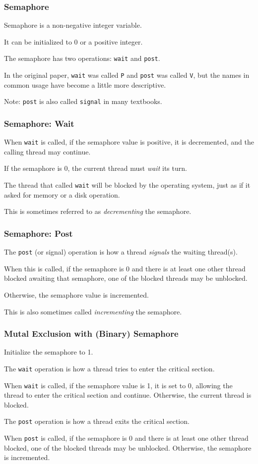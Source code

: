 \begin{frame}
	\frametitle{Semaphore}

	Semaphore is a \alert{non-negative} integer variable.

	It can be initialized to 0 or a positive integer.

	The semaphore has two operations: \texttt{wait} and \texttt{post}.

	In the original paper, \texttt{wait} was called \texttt{P} and \texttt{post} was called \texttt{V}, but the names in common usage have become a little more descriptive.

	Note: \texttt{post} is also called \texttt{signal} in many textbooks.


\end{frame}

\begin{frame}
	\frametitle{Semaphore: Wait}

	When \texttt{wait} is called, if the semaphore value is positive, it is decremented, and the calling thread may continue.

	If the semaphore is 0, the current thread must \textit{wait} its turn.

	The thread that called \texttt{wait} will be blocked by the operating system, just as if it asked for memory or a disk operation.

	This is sometimes referred to as \emph{decrementing} the semaphore.

\end{frame}

\begin{frame}
	\frametitle{Semaphore: Post}

	The \texttt{post} (or signal) operation is how a thread \textit{signals} the waiting thread(s).

	When this is called, if the semaphore is 0 and there is at least one other thread blocked awaiting that semaphore, one of the blocked threads may be unblocked.

	Otherwise, the semaphore value is incremented.

	This is also sometimes called \emph{incrementing} the semaphore.

\end{frame}

\begin{frame}
	\frametitle{Mutal Exclusion with (Binary) Semaphore}

	Initialize the semaphore to 1.

	The \texttt{wait} operation is how a thread tries to enter the critical section.

	When \texttt{wait} is called, if the semaphore value is 1, it is set to 0, allowing the thread to enter the critical section and continue.
	Otherwise, the current thread is blocked.

	The \texttt{post} operation is how a thread exits the critical section.

	When \texttt{post} is called, if the semaphore is 0 and there is at least one other thread blocked, one of the blocked threads may be unblocked.
	Otherwise, the semaphore is incremented.

\end{frame}

